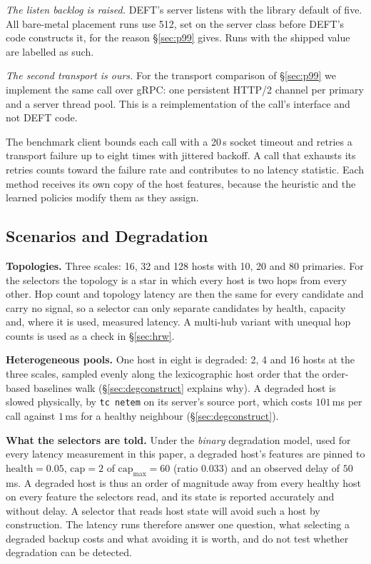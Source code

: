 \documentclass[journal]{IEEEtran}
\begin{document}
\emph{The listen backlog is raised.} DEFT's server listens with the library
default of five. All bare-metal placement runs use 512, set on the server class
before DEFT's code constructs it, for the reason \S\ref{sec:p99} gives. Runs
with the shipped value are labelled as such.

\emph{The second transport is ours.} For the transport comparison of
\S\ref{sec:p99} we implement the same call over gRPC: one persistent HTTP/2
channel per primary and a server thread pool. This is a reimplementation of the
call's interface and not DEFT code.

The benchmark client bounds each call with a 20\,s socket timeout and retries a
transport failure up to eight times with jittered backoff. A call that exhausts
its retries counts toward the failure rate and contributes to no latency
statistic. Each method receives its own copy of the host features, because the
heuristic and the learned policies modify them as they assign.

\subsection{Scenarios and Degradation}
\label{sec:scenarios}

\textbf{Topologies.} Three scales: 16, 32 and 128 hosts with 10, 20 and 80
primaries. For the selectors the topology is a star in which every host is two
hops from every other. Hop count and topology latency are then the same for
every candidate and carry no signal, so a selector can only separate candidates
by health, capacity and, where it is used, measured latency. A multi-hub variant
with unequal hop counts is used as a check in \S\ref{sec:hrw}.

\textbf{Heterogeneous pools.} One host in eight is degraded: 2, 4 and 16 hosts
at the three scales, sampled evenly along the lexicographic host order that the
order-based baselines walk (\S\ref{sec:degconstruct} explains why). A degraded
host is slowed physically, by \texttt{tc netem} on its server's source port,
which costs $101$\,ms per call against $1$\,ms for a healthy neighbour
(\S\ref{sec:degconstruct}).

\textbf{What the selectors are told.} Under the \emph{binary} degradation model,
used for every latency measurement in this paper, a degraded host's features are
pinned to $\mathrm{health}=0.05$, $\mathrm{cap}=2$ of $\mathrm{cap}_{\max}=60$
(ratio $0.033$) and an observed delay of $50$\,ms. A degraded host is thus an
order of magnitude away from every healthy host on every feature the selectors
read, and its state is reported accurately and without delay. A selector that
reads host state will avoid such a host by construction. The latency runs
therefore answer one question, what selecting a degraded backup costs and what
avoiding it is worth, and do not test whether degradation can be detected.
\end{document}
